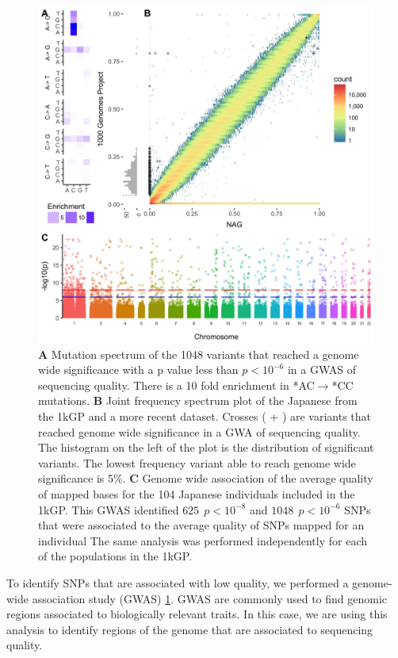 \documentclass[9pt,lineno]{elife}
\begin{document}
\begin{figure}
\includegraphics[width=\hsize,keepaspectratio]{Figure1.jpg}
\caption{
\textbf{A} 
Mutation spectrum of the 1048 variants that reached a genome wide significance with a p value less than $p < 10^{-6}$  in a GWAS of sequencing quality. 
There is a 10 fold enrichment in *AC${\rightarrow}$*CC mutations. 
\textbf{B} 
Joint frequency spectrum plot of the Japanese from the 1kGP and a more recent dataset.
Crosses ( + ) are variants that reached genome wide significance in a GWA of sequencing quality. 
The histogram on the left of the plot is the distribution of significant variants. 
The lowest frequency variant able to reach genome wide significance is 5\%.
\textbf{C} 
Genome wide association of the average quality of mapped bases for the 104 Japanese individuals included in the 1kGP. This GWAS identified $625\ \  p < 10^{-8}$ and $1048\ \ p < 10^{-6}$ SNPs that were associated to the average quality of SNPs mapped for an individual
The same analysis was performed independently for each of the populations in the 1kGP. }
 \label{SFS}
\end{figure}

To identify SNPs that are associated with low quality, we performed a genome-wide association study (GWAS)  \ref{SFS}. 
GWAS are commonly used to find genomic regions associated to biologically relevant traits. In this case, we are using this analysis to identify regions of the genome that are associated to sequencing quality.
 
\end{document}
